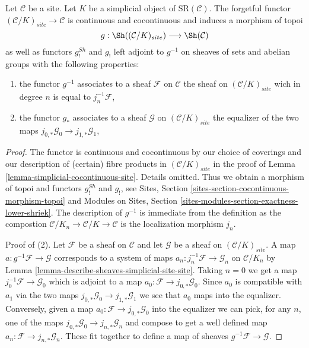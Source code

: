 \begin{lemma}
\label{lemma-comparison}
Let $\mathcal{C}$ be a site. Let $K$ be a simplicial object of
$\text{SR}(\mathcal{C})$. The forgetful functor
$(\mathcal{C}/K)_{site} \to \mathcal{C}$ is continuous and cocontinuous
and induces a morphism of topoi
$$
g : \Sh((\mathcal{C}/K)_{site}) \longrightarrow \Sh(\mathcal{C})
$$
as well as functors $g^{Sh}_!$ and $g_!$ left adjoint to $g^{-1}$
on sheaves of sets and abelian groups with the following properties:
\begin{enumerate}
\item the functor $g^{-1}$ associates to a sheaf $\mathcal{F}$ on
$\mathcal{C}$ the sheaf on $(\mathcal{C}/K)_{site}$ wich in degree $n$
is equal to $j_n^{-1}\mathcal{F}$,
\item the functor $g_*$ associates to a sheaf $\mathcal{G}$ on
$(\mathcal{C}/K)_{site}$ the equalizer of the two maps
$j_{0, *}\mathcal{G}_0 \to j_{1, *}\mathcal{G}_1$,
\end{enumerate}
\end{lemma}

\begin{proof}
The functor is continuous and cocontinuous by our choice of coverings and
our description of (certain) fibre products in $(\mathcal{C}/K)_{site}$
in the proof of Lemma \ref{lemma-simplicial-cocontinuous-site}. Details omitted.
Thus we obtain a morphism of topoi and functors $g^{Sh}_!$ and $g_!$, see
Sites, Section \ref{sites-section-cocontinuous-morphism-topoi} and
Modules on Sites, Section
\ref{sites-modules-section-exactness-lower-shriek}.
The description of $g^{-1}$ is immediate from the definition as the
compostion $\mathcal{C}/K_n \to \mathcal{C}/K \to \mathcal{C}$ is
the localization morphism $j_n$.

\medskip\noindent
Proof of (2). Let $\mathcal{F}$ be a sheaf on $\mathcal{C}$ and let
$\mathcal{G}$ be a sheaf on $(\mathcal{C}/K)_{site}$. A map
$a : g^{-1}\mathcal{F} \to \mathcal{G}$ corresponds to a system of maps
$a_n : j_n^{-1}\mathcal{F} \to \mathcal{G}_n$ on $\mathcal{C}/K_n$
by Lemma \ref{lemma-describe-sheaves-simplicial-site-site}.
Taking $n = 0$ we get a map $j_0^{-1}\mathcal{F} \to \mathcal{G}_0$
which is adjoint to a map $a_0 : \mathcal{F} \to j_{0, *}\mathcal{G}_0$.
Since $a_0$ is compatible with $a_1$ via the two maps
$j_{0, *}\mathcal{G}_0 \to j_{1, *}\mathcal{G}_1$ we see that
$a_0$ maps into the equalizer. Conversely, given a map
$a_0 : \mathcal{F} \to j_{0, *}\mathcal{G}_0$ into the equalizer
we can pick, for any $n$, one of the maps
$j_{0, *}\mathcal{G}_0 \to j_{n, *}\mathcal{G}_n$ and compose
to get a well defined map $a_n : \mathcal{F} \to j_{n, *}\mathcal{G}_n$.
These fit together to define a map of sheaves
$g^{-1}\mathcal{F} \to \mathcal{G}$.
\end{proof}

